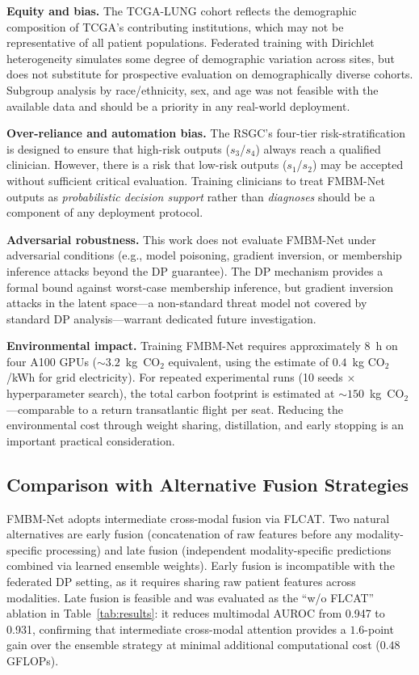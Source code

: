 \documentclass{ieeeaccess}
\begin{document}
\textbf{Equity and bias.}
The TCGA-LUNG cohort reflects the demographic composition of TCGA's
contributing institutions, which may not be representative of all patient
populations. Federated training with Dirichlet heterogeneity simulates
some degree of demographic variation across sites, but does not substitute
for prospective evaluation on demographically diverse cohorts. Subgroup
analysis by race/ethnicity, sex, and age was not feasible with the available
data and should be a priority in any real-world deployment.

\textbf{Over-reliance and automation bias.}
The RSGC's four-tier risk-stratification is designed to ensure that
high-risk outputs ($s_3$/$s_4$) always reach a qualified clinician.
However, there is a risk that low-risk outputs ($s_1$/$s_2$) may be accepted
without sufficient critical evaluation. Training clinicians to treat FMBM-Net
outputs as \emph{probabilistic decision support} rather than \emph{diagnoses}
should be a component of any deployment protocol.

\textbf{Adversarial robustness.}
This work does not evaluate FMBM-Net under adversarial conditions
(e.g., model poisoning, gradient inversion, or membership inference attacks
beyond the DP guarantee). The DP mechanism provides a formal bound against
worst-case membership inference, but gradient inversion attacks in the latent
space---a non-standard threat model not covered by standard DP
analysis---warrant dedicated future investigation.

\textbf{Environmental impact.}
Training FMBM-Net requires approximately $8$~h on four A100 GPUs
($\sim\!3.2$~kg~CO$_2$ equivalent, using the estimate of
$0.4$~kg CO$_2$/kWh for grid electricity). For repeated experimental runs
(10 seeds $\times$ hyperparameter search), the total carbon footprint is
estimated at $\sim\!150$~kg~CO$_2$---comparable to a return transatlantic
flight per seat. Reducing the environmental cost through weight sharing,
distillation, and early stopping is an important practical consideration.



\subsection{Comparison with Alternative Fusion Strategies}

FMBM-Net adopts intermediate cross-modal fusion via FLCAT. Two natural
alternatives are early fusion (concatenation of raw features before any
modality-specific processing) and late fusion (independent modality-specific
predictions combined via learned ensemble weights). Early fusion is
incompatible with the federated DP setting, as it requires sharing raw
patient features across modalities. Late fusion is feasible and was evaluated
as the ``w/o FLCAT'' ablation in Table~\ref{tab:results}: it reduces
multimodal AUROC from 0.947 to 0.931, confirming that intermediate
cross-modal attention provides a $1.6$-point gain over the ensemble strategy
at minimal additional computational cost ($0.48$ GFLOPs).
\end{document}
